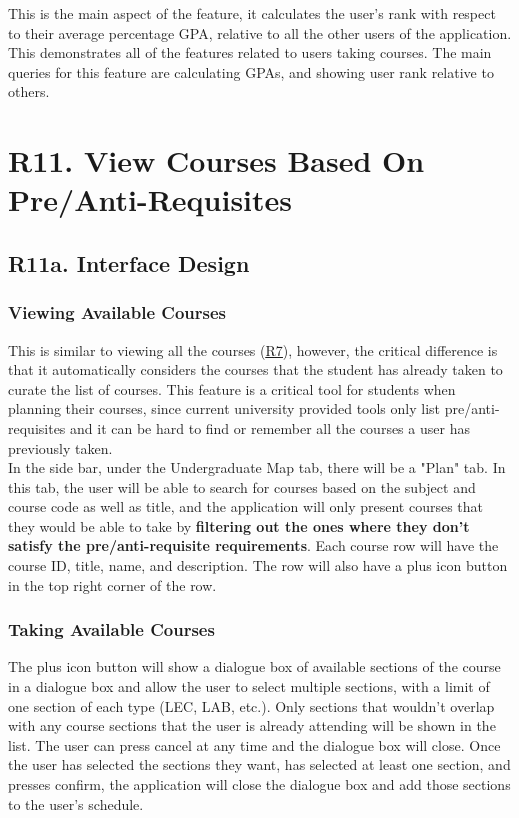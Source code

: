 \documentclass[12pt, a4paper]{article}
\begin{document}
This is the main aspect of the feature, it calculates the user's rank with respect to their average percentage GPA, relative to all the other users of the application.\\
This demonstrates all of the features related to users taking courses. The main queries for this feature are calculating GPAs, and showing user rank relative to others.

\section*{R11. View Courses Based On Pre/Anti-Requisites}
\label{sec:R11}
\subsection*{R11a. Interface Design}
\subsubsection*{Viewing Available Courses}
This is similar to viewing all the courses (\underline{\hyperref[sec:R7]{R7}}), however, the critical difference is that it automatically considers the courses that the student has already taken to curate the list of courses. This feature is a critical tool for students when planning their courses, since current university provided tools only list pre/anti-requisites and it can be hard to find or remember all the courses a user has previously taken.\\

In the side bar, under the Undergraduate Map tab, there will be a "Plan" tab. In this tab, the user will be able to search for courses based on the subject and course code as well as title, and the application will only present courses that they would be able to take by \textbf{filtering out the ones where they don't satisfy the pre/anti-requisite requirements}. Each course row will have the course ID, title, name, and description. The row will also have a plus icon button in the top right corner of the row.
\subsubsection*{Taking Available Courses}
The plus icon button will show a dialogue box of available sections of the course in a dialogue box and allow the user to select multiple sections, with a limit of one section of each type (LEC, LAB, etc.). Only sections that wouldn't overlap with any course sections that the user is already attending will be shown in the list. The user can press cancel at any time and the dialogue box will close. Once the user has selected the sections they want, has selected at least one section, and presses confirm, the application will close the dialogue box and add those sections to the user's schedule.
\end{document}
